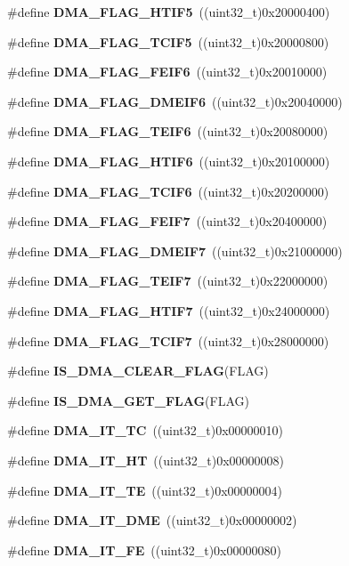 \begin{DoxyCompactItemize}
\item 
\#define \textbf{ D\+M\+A\+\_\+\+F\+L\+A\+G\+\_\+\+H\+T\+I\+F5}~((uint32\+\_\+t)0x20000400)
\item 
\#define \textbf{ D\+M\+A\+\_\+\+F\+L\+A\+G\+\_\+\+T\+C\+I\+F5}~((uint32\+\_\+t)0x20000800)
\item 
\#define \textbf{ D\+M\+A\+\_\+\+F\+L\+A\+G\+\_\+\+F\+E\+I\+F6}~((uint32\+\_\+t)0x20010000)
\item 
\#define \textbf{ D\+M\+A\+\_\+\+F\+L\+A\+G\+\_\+\+D\+M\+E\+I\+F6}~((uint32\+\_\+t)0x20040000)
\item 
\#define \textbf{ D\+M\+A\+\_\+\+F\+L\+A\+G\+\_\+\+T\+E\+I\+F6}~((uint32\+\_\+t)0x20080000)
\item 
\#define \textbf{ D\+M\+A\+\_\+\+F\+L\+A\+G\+\_\+\+H\+T\+I\+F6}~((uint32\+\_\+t)0x20100000)
\item 
\#define \textbf{ D\+M\+A\+\_\+\+F\+L\+A\+G\+\_\+\+T\+C\+I\+F6}~((uint32\+\_\+t)0x20200000)
\item 
\#define \textbf{ D\+M\+A\+\_\+\+F\+L\+A\+G\+\_\+\+F\+E\+I\+F7}~((uint32\+\_\+t)0x20400000)
\item 
\#define \textbf{ D\+M\+A\+\_\+\+F\+L\+A\+G\+\_\+\+D\+M\+E\+I\+F7}~((uint32\+\_\+t)0x21000000)
\item 
\#define \textbf{ D\+M\+A\+\_\+\+F\+L\+A\+G\+\_\+\+T\+E\+I\+F7}~((uint32\+\_\+t)0x22000000)
\item 
\#define \textbf{ D\+M\+A\+\_\+\+F\+L\+A\+G\+\_\+\+H\+T\+I\+F7}~((uint32\+\_\+t)0x24000000)
\item 
\#define \textbf{ D\+M\+A\+\_\+\+F\+L\+A\+G\+\_\+\+T\+C\+I\+F7}~((uint32\+\_\+t)0x28000000)
\item 
\#define \textbf{ I\+S\+\_\+\+D\+M\+A\+\_\+\+C\+L\+E\+A\+R\+\_\+\+F\+L\+AG}(F\+L\+AG)
\item 
\#define \textbf{ I\+S\+\_\+\+D\+M\+A\+\_\+\+G\+E\+T\+\_\+\+F\+L\+AG}(F\+L\+AG)
\item 
\#define \textbf{ D\+M\+A\+\_\+\+I\+T\+\_\+\+TC}~((uint32\+\_\+t)0x00000010)
\item 
\#define \textbf{ D\+M\+A\+\_\+\+I\+T\+\_\+\+HT}~((uint32\+\_\+t)0x00000008)
\item 
\#define \textbf{ D\+M\+A\+\_\+\+I\+T\+\_\+\+TE}~((uint32\+\_\+t)0x00000004)
\item 
\#define \textbf{ D\+M\+A\+\_\+\+I\+T\+\_\+\+D\+ME}~((uint32\+\_\+t)0x00000002)
\item 
\#define \textbf{ D\+M\+A\+\_\+\+I\+T\+\_\+\+FE}~((uint32\+\_\+t)0x00000080)
\item 

\end{DoxyCompactItemize}
